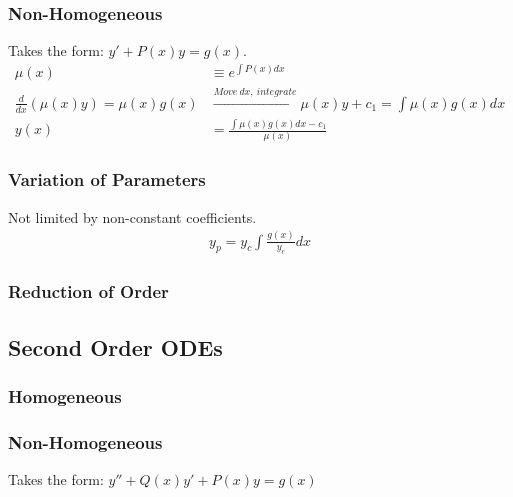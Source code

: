 \documentclass{article}
\begin{document}
    \subsubsection{Non-Homogeneous}
        Takes the form: $y'+P(x)y=g(x)$. 
        \begin{align*}
            \mu(x)
            &\equiv e^{\int P(x) dx}\\
            \frac{d}{dx}(\mu(x)y)=\mu(x)g(x) 
            &\xrightarrow{Move\ dx,\ integrate} \mu(x)y +c_1=\int \mu(x) g(x)dx\\
            y(x)
            &=\frac{\int \mu(x) g(x)dx - c_1}{\mu(x)}
        \end{align*}

        \subsubsection*{Variation of Parameters}
        Not limited by non-constant coefficients. 
        \begin{align*}
            y_p=y_c\int{\frac{g(x)}{y_c}dx}
        \end{align*}    
        \subsubsection{Reduction of Order}
\subsection{Second Order ODEs}
    \subsubsection{Homogeneous}
    \subsubsection{Non-Homogeneous}
        Takes the form: $y''+Q(x)y'+P(x)y=g(x)$
\end{document}
